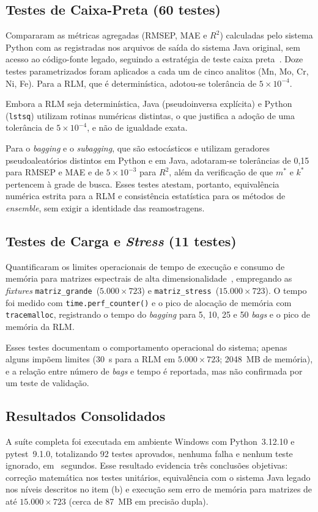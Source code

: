 \subsection{Testes de Caixa-Preta (60 testes)}
Compararam as métricas agregadas (RMSEP, MAE e $R^2$) calculadas pelo sistema
Python com as registradas nos arquivos de saída do sistema Java original, sem
acesso ao código-fonte legado, seguindo a estratégia de teste caixa preta~\cite{pressman2016}. Doze testes parametrizados foram aplicados a
cada um de cinco analitos (Mn, Mo, Cr, Ni, Fe). Para a RLM, que é
determinística, adotou-se tolerância de $5\times10^{-4}$.

Embora a RLM seja determinística, Java (pseudoinversa explícita) e Python
(\texttt{lstsq}) utilizam rotinas numéricas distintas, o que justifica a
adoção de uma tolerância de $5\times10^{-4}$, e não de igualdade exata.

Para o \textit{bagging} e o \textit{subagging}, que são estocásticos e
utilizam geradores pseudoaleatórios distintos em Python e em Java, adotaram-se
tolerâncias de 0,15 para RMSEP e MAE e de $5\times10^{-3}$ para $R^2$, além da
verificação de que $m^*$ e $k^*$ pertencem à grade de busca. Esses testes
atestam, portanto, equivalência numérica estrita para a RLM e consistência
estatística para os métodos de \textit{ensemble}, sem exigir a identidade das
reamostragens.

\subsection{Testes de Carga e \textit{Stress} (11 testes)}
Quantificaram os limites operacionais de tempo de execução e consumo de
memória para matrizes espectrais de alta dimensionalidade~\cite{sommerville2011},
empregando as \textit{fixtures} \texttt{matriz\_grande}~($5.000\times723$) e
\texttt{matriz\_stress}~($15.000\times723$). O tempo foi medido com
\texttt{time.perf\_counter()} e o pico de alocação de memória com
\texttt{tracemalloc}, registrando o tempo do \textit{bagging} para 5, 10, 25 e
50 \textit{bags} e o pico de memória da RLM.

Esses testes documentam o comportamento operacional do sistema; apenas alguns
impõem limites (30~s para a RLM em $5.000\times723$; 2048~MB de memória), e a
relação entre número de \textit{bags} e tempo é reportada, mas não confirmada
por um teste de validação.

\subsection{Resultados Consolidados}
A suíte completa foi executada em ambiente Windows com Python~3.12.10 e pytest~9.1.0, totalizando 92 testes
aprovados, nenhuma falha e nenhum teste ignorado, em \testes~segundos. Esse resultado evidencia três conclusões objetivas: correção matemática nos testes unitários, equivalência com o sistema Java legado nos níveis descritos
no item (b) e execução sem erro de memória para matrizes de até $15.000\times723$ (cerca de 87~MB em precisão dupla).



